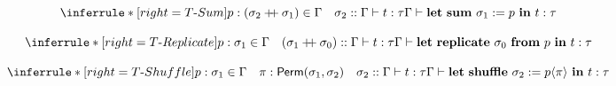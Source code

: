 \[
    \inferrule*[right=T\text{-}Sum]{p : (\sigma_2 \append \sigma_1)\mem\Gamma \quad \judg{\sigma_2::\Gamma}{t}{\tau}}
    {\judg{\Gamma}{\mathbf{let\ sum}\ \sigma_1 := p\ \mathbf{in}\ t}{\tau}}
\]

\[
    \inferrule*[right=T\text{-}Replicate]{p:\sigma_1\mem\Gamma \quad \judg{(\sigma_1 \append \sigma_0)::\Gamma}{t}{\tau}}
    {\judg{\Gamma}{\mathbf{let\ replicate}\ \sigma_0\ \mathbf{from}\ p\ \mathbf{in}\ t}{\tau}}
\]

\[
    \inferrule*[right=T\text{-}Shuffle]{p:\sigma_1\mem\Gamma \quad \pi:\Permsym(\sigma_1,\sigma_2) \quad \judg{\sigma_2::\Gamma}{t}{\tau}}
    {\judg{\Gamma}{\mathbf{let\ shuffle}\ \sigma_2 := p\langle \pi\rangle\ \mathbf{in}\ t}{\tau}}
\]